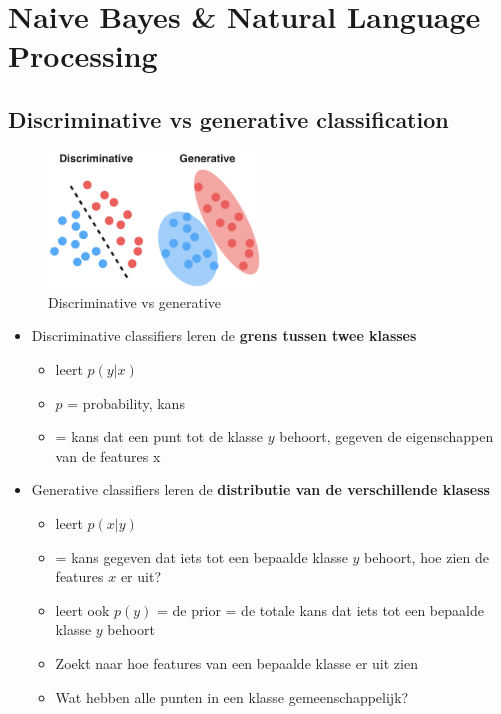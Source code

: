 \documentclass{article}
\begin{document}
\section{Naive Bayes \& Natural Language Processing}
\subsection{Discriminative vs generative classification}

\begin{figure}[H]
    \centering
    \includegraphics[width=0.5\textwidth]{discriminative-vs-generative.png}
    \caption{Discriminative vs generative}
\end{figure}

\begin{itemize}
    \item Discriminative classifiers leren de \textbf{grens tussen twee klasses}
    \begin{itemize}
        \item leert $p(y|x)$
        \item $p$ = probability, kans
        \item = kans dat een punt tot de klasse $y$ behoort, gegeven de eigenschappen van de features x
    \end{itemize}
    \item Generative classifiers leren de \textbf{distributie van de verschillende klasess}
    \begin{itemize}
        \item leert $p(x|y)$ 
        \item = kans gegeven dat iets tot een bepaalde klasse $y$ behoort, hoe zien de features $x$ er uit?
        \item leert ook $p(y)$ = de prior = de totale kans dat iets tot een bepaalde klasse $y$ behoort
        \item Zoekt naar hoe features van een bepaalde klasse er uit zien
        \item Wat hebben alle punten in een klasse gemeenschappelijk?
    \end{itemize}
\end{itemize}
\end{document}
